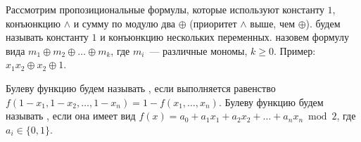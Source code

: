 

\setmathstyle{}{}{}
\setcounter{curtask}{11}




\begin{definition*}
    Рассмотрим пропозициональные формулы, которые используют константу $1$, конъюнкцию $\land$ и сумму по
    модулю два $\oplus$ (приоритет $\land$ выше, чем $\oplus$).  будем называть
    константу $1$ и конъюнкцию нескольких переменных.  назовем формулу
    вида $m_1 \oplus m_2 \oplus \dots \oplus m_k$, где $m_i$~--- различные мономы, $k \ge 0$. Пример:
    $x_1 x_2 \oplus x_2 \oplus 1$.
\end{definition*}


\begin{definition*}
    Булеву функцию будем называть , если выполняется равенство $f(1 - x_1, 1 -
    x_2, \dots, 1 - x_n) = 1 - f(x_1, \dots, x_n)$. Булеву функцию будем называть ,
    если она имеет вид $f(x) = a_0 + a_1 x_1 + a_2 x_2 + \dots + a_nx_n \bmod 2$, где $a_i \in \{0,
    1\}$.
\end{definition*}







